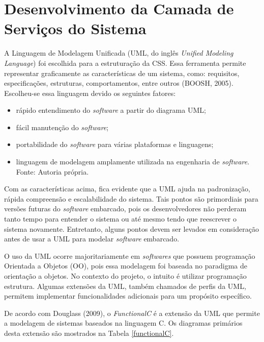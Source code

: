 \section{Desenvolvimento da Camada de Serviços do Sistema}

A Linguagem de Modelagem Unificada (UML, do inglês \textit{Unified Modeling Language}) foi escolhida para a estruturação da CSS. Essa ferramenta permite representar graficamente as características de um sistema, como: requisitos, especificações, estruturas, comportamentos, entre outros (BOOSH, 2005). Escolheu-se essa linguagem devido os seguintes fatores:

\begin{itemize}
	\item rápido entendimento do \textit{software} a partir do diagrama UML;
	
	\item fácil manutenção do \textit{software};
	
	\item portabilidade do \textit{software} para várias plataformas e linguagens;
	
	\item linguagem de modelagem amplamente utilizada na engenharia de \textit{software}.
		\centering
	\footnotesize{Fonte: Autoria própria.}
\end{itemize}


Com as características acima, fica evidente que a UML ajuda na padronização, rápida compreensão e escalabilidade do sistema. Tais pontos são primordiais para versões futuras do \textit{software} embarcado, pois os desenvolvedores não perderam tanto tempo para entender o sistema ou até mesmo tendo que reescrever o sistema novamente. Entretanto, alguns pontos devem ser levados em consideração antes de usar a UML para modelar \textit{software} embarcado.

O uso da UML ocorre majoritariamente em \textit{softwares} que possuem programação Orientada a Objetos (OO), pois essa modelagem foi baseada no paradigma de orientação a objetos. No contexto do projeto, o intuito é utilizar programação estrutura. Algumas extensões da UML, também chamados de perfis da UML, permitem implementar funcionalidades adicionais para um propósito específico.

De acordo com Douglass (2009), o \textit{FunctionalC} é a extensão da UML que permite a modelagem de sistemas baseados na linguagem C. Os diagramas primários desta extensão são mostrados na Tabela \ref{functionalC}. 


